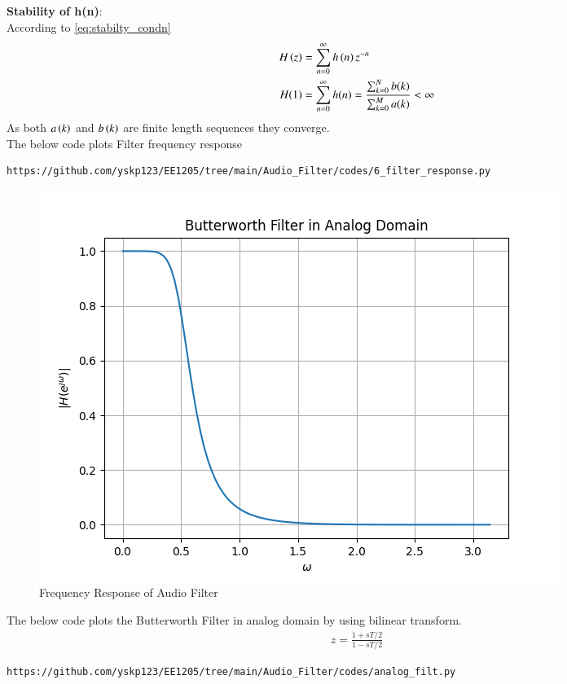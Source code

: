 \documentclass[journal,12pt,twocolumn]{IEEEtran}
\theoremstyle{remark}
\begin{document}
\begin{enumerate}[label=\thesection.\arabic*]
\textbf{Stability of h(n)}:\\
According to \eqref{eq:stabilty_condn}
\begin{align}
H\left(z\right) &= \sum_{n = 0}^{\infty} h\left(n\right)z^{-n}\\
H(1)&= \sum_{n = 0}^{\infty}h(n)  = \frac{\sum_{k = 0}^{N}b(k)}{\sum_{k = 0}^{M}a(k)}< \infty
\end{align}
As both $a\left(k\right)$ and $b\left(k\right)$ are finite length sequences they converge.\\
The below code plots Filter frequency response
\begin{lstlisting}
https://github.com/yskp123/EE1205/tree/main/Audio_Filter/codes/6_filter_response.py
\end{lstlisting}
\begin{figure}[H]
\centering
\includegraphics[width=1\columnwidth]{figs/Filter_Response.png}
\caption{Frequency Response of Audio Filter}
\label{fig:H(w)_6}
\end{figure}
The below code plots the Butterworth Filter in analog domain by using bilinear transform.
\begin{align}
    z=\frac{1+sT/2}{1-sT/2}
\end{align}
\begin{lstlisting}
https://github.com/yskp123/EE1205/tree/main/Audio_Filter/codes/analog_filt.py
\end{lstlisting}
\begin{figure}[H]
\centering

\end{figure}
\end{enumerate}
\end{document}
